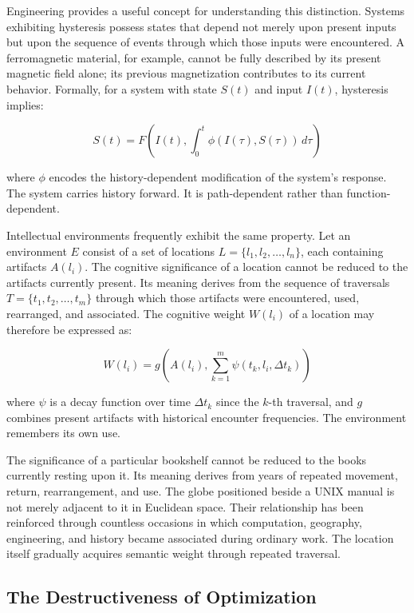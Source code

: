 \documentclass[12pt,oneside]{article}
\theoremstyle{remark}
\begin{document}
Engineering provides a useful concept for understanding this distinction. Systems exhibiting hysteresis possess states that depend not merely upon present inputs but upon the sequence of events through which those inputs were encountered. A ferromagnetic material, for example, cannot be fully described by its present magnetic field alone; its previous magnetization contributes to its current behavior. Formally, for a system with state $S(t)$ and input $I(t)$, hysteresis implies:

\begin{equation}
S(t) = F\left(I(t), \int_{0}^{t} \phi(I(\tau), S(\tau))\,d\tau\right)
\end{equation}

where $\phi$ encodes the history-dependent modification of the system's response. The system carries history forward. It is path-dependent rather than function-dependent.

Intellectual environments frequently exhibit the same property. Let an environment $E$ consist of a set of locations $L = \{l_1, l_2, \ldots, l_n\}$, each containing artifacts $A(l_i)$. The cognitive significance of a location cannot be reduced to the artifacts currently present. Its meaning derives from the sequence of traversals $T = \{t_1, t_2, \ldots, t_m\}$ through which those artifacts were encountered, used, rearranged, and associated. The cognitive weight $W(l_i)$ of a location may therefore be expressed as:

\begin{equation}
W(l_i) = g\left(A(l_i), \sum_{k=1}^{m} \psi(t_k, l_i, \Delta t_k)\right)
\end{equation}

where $\psi$ is a decay function over time $\Delta t_k$ since the $k$-th traversal, and $g$ combines present artifacts with historical encounter frequencies. The environment remembers its own use.

The significance of a particular bookshelf cannot be reduced to the books currently resting upon it. Its meaning derives from years of repeated movement, return, rearrangement, and use. The globe positioned beside a UNIX manual is not merely adjacent to it in Euclidean space. Their relationship has been reinforced through countless occasions in which computation, geography, engineering, and history became associated during ordinary work. The location itself gradually acquires semantic weight through repeated traversal.

\subsection{The Destructiveness of Optimization}
\end{document}
